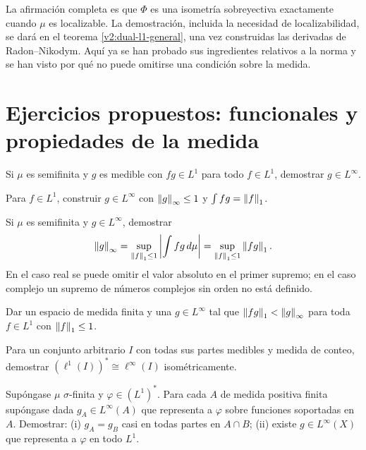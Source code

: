 La afirmación completa es que $\Phi$ es una isometría sobreyectiva exactamente cuando $\mu$ es localizable. La demostración, incluida la necesidad de localizabilidad, se dará en el teorema \ref{v2:dual-l1-general}, una vez construidas las derivadas de Radon--Nikodym. Aquí ya se han probado sus ingredientes relativos a la norma y se han visto por qué no puede omitirse una condición sobre la medida.

\section{Ejercicios propuestos: funcionales y propiedades de la medida}
\begin{ejercicio}\label{ej:v2-l23-1}
Si $\mu$ es semifinita y $g$ es medible con $fg\in L^1$ para todo $f\in L^1$, demostrar $g\in L^\infty$.
\end{ejercicio}

\begin{ejercicio}\label{ej:v2-l23-2}
Para $f\in L^1$, construir $g\in L^\infty$ con $\left\lVert g\right\rVert_\infty\le1$ y $\int fg=\left\lVert f\right\rVert_1$.
\end{ejercicio}

\begin{ejercicio}\label{ej:v2-l23-3}
Si $\mu$ es semifinita y $g\in L^\infty$, demostrar
\[
 \left\lVert g\right\rVert_\infty=\sup_{\left\lVert f\right\rVert_1\le1}\left|\int fg\,d\mu\right|
 =\sup_{\left\lVert f\right\rVert_1\le1}\left\lVert fg\right\rVert_1.
\]
En el caso real se puede omitir el valor absoluto en el primer supremo; en el caso complejo un supremo de números complejos sin orden no está definido.
\end{ejercicio}

\begin{ejercicio}\label{ej:v2-l23-4}
Dar un espacio de medida finita y una $g\in L^\infty$ tal que $\left\lVert fg\right\rVert_1<\left\lVert g\right\rVert_\infty$ para toda $f\in L^1$ con $\left\lVert f\right\rVert_1\le1$.
\end{ejercicio}

\begin{ejercicio}\label{ej:v2-l23-5}
Para un conjunto arbitrario $I$ con todas sus partes medibles y medida de conteo, demostrar $(\ell^1(I))^*\cong\ell^\infty(I)$ isométricamente.
\end{ejercicio}

\begin{ejercicio}\label{ej:v2-l23-6}
Supóngase $\mu$ $\sigma$-finita y $\varphi\in(L^1)^*$. Para cada $A$ de medida positiva finita supóngase dada $g_A\in L^\infty(A)$ que representa a $\varphi$ sobre funciones soportadas en $A$. Demostrar: (i) $g_A=g_B$ casi en todas partes en $A\cap B$; (ii) existe $g\in L^\infty(X)$ que representa a $\varphi$ en todo $L^1$.
\end{ejercicio}

